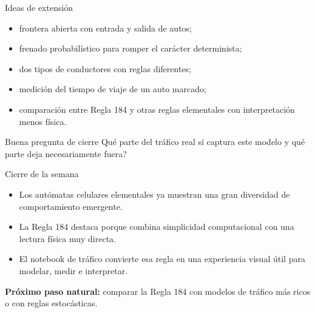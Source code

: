 \begin{frame}{Ideas de extensión}
\begin{itemize}
    \item frontera abierta con entrada y salida de autos;
    \item frenado probabilístico para romper el carácter determinista;
    \item dos tipos de conductores con reglas diferentes;
    \item medición del tiempo de viaje de un auto marcado;
    \item comparación entre Regla 184 y otras reglas elementales con interpretación menos física.
\end{itemize}

\begin{alertblock}{Buena pregunta de cierre}
\textquestiondown Qué parte del tráfico real sí captura este modelo y qué parte deja necesariamente fuera?
\end{alertblock}
\end{frame}

\begin{frame}{Cierre de la semana}
\begin{itemize}
    \item Los autómatas celulares elementales ya muestran una gran diversidad de comportamiento emergente.
    \item La Regla 184 destaca porque combina simplicidad computacional con una lectura física muy directa.
    \item El notebook de tráfico convierte esa regla en una experiencia visual útil para modelar, medir e interpretar.
\end{itemize}

\vspace{0.2cm}
\centering
\textbf{Próximo paso natural:} comparar la Regla 184 con modelos de tráfico más ricos o con reglas estocásticas.
\end{frame}


